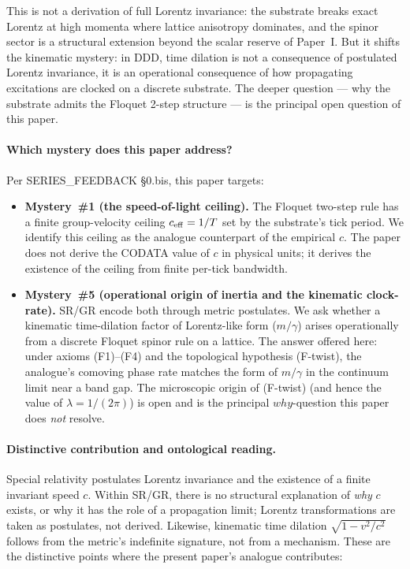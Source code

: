 \documentclass[11pt,a4paper]{article}
\begin{document}
This is not a derivation of full Lorentz invariance: the substrate
breaks exact Lorentz at high momenta where lattice anisotropy
dominates, and the spinor sector is a structural extension beyond the
scalar reserve of Paper~I. But it shifts the kinematic mystery: in
DDD, time dilation is not a consequence of postulated Lorentz
invariance, it is an operational consequence of how propagating
excitations are clocked on a discrete substrate. The deeper question
--- why the substrate admits the Floquet 2-step structure --- is the
principal open question of this paper.




\paragraph{Which mystery does this paper address?}
Per SERIES\_FEEDBACK §0.bis, this paper targets:

\begin{itemize}
\item \textbf{Mystery~\#1 (the speed-of-light ceiling).} The
Floquet two-step rule has a finite group-velocity ceiling
$c_{\rm eff} = 1/T$ set by the substrate's tick period. We
identify this ceiling as the analogue counterpart of the
empirical $c$. The paper does not derive the CODATA value of
$c$ in physical units; it derives the existence of the ceiling
from finite per-tick bandwidth.
\item \textbf{Mystery~\#5 (operational origin of inertia and
the kinematic clock-rate).} SR/GR encode both through metric
postulates. We ask whether a kinematic time-dilation factor of
Lorentz-like form ($m/\gamma$) arises operationally from a
discrete Floquet spinor rule on a lattice. The answer offered
here: under axioms (F1)--(F4) and the topological hypothesis
(F-twist), the analogue's comoving phase rate matches the
form of $m/\gamma$ in the continuum limit near a band gap.
The microscopic origin of (F-twist) (and hence the value of
$\lambda = 1/(2\pi)$) is open and is the principal
$why$-question this paper does \emph{not} resolve.
\end{itemize}

\paragraph{Distinctive contribution and ontological reading.}
Special relativity postulates Lorentz invariance and the
existence of a finite invariant speed $c$. Within SR/GR, there
is no structural explanation of \emph{why} $c$ exists, or why
it has the role of a propagation limit; Lorentz transformations
are taken as postulates, not derived. Likewise, kinematic time
dilation $\sqrt{1 - v^2/c^2}$ follows from the metric's
indefinite signature, not from a mechanism. These are the
distinctive points where the present paper's analogue
contributes:
\end{document}
